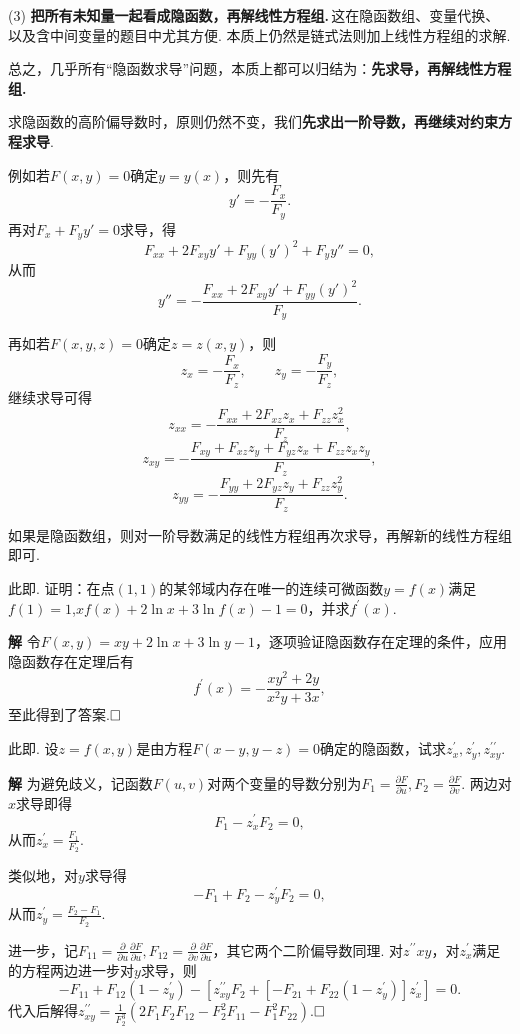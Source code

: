 \documentclass{ctexart}
\newenvironment{custom}[1]{\par\noindent \textbf{#1}\quad}{\par\vspace{1em}}
\begin{document}
(3) {\bf 把所有未知量一起看成隐函数，再解线性方程组.}\,这在隐函数组、变量代换、以及含中间变量的题目中尤其方便. 本质上仍然是链式法则加上线性方程组的求解.

总之，几乎所有“隐函数求导”问题，本质上都可以归结为：{\bf 先求导，再解线性方程组.}

求隐函数的高阶偏导数时，原则仍然不变，我们{\bf 先求出一阶导数，再继续对约束方程求导}.

例如若$F(x,y)=0$确定$y=y(x)$，则先有
\[
y'=-\frac{F_x}{F_y}.
\]
再对$F_x+F_y y'=0$求导，得
\[
F_{xx}+2F_{xy}y'+F_{yy}(y')^2+F_y y''=0,
\]
从而
\[
y''=-\frac{F_{xx}+2F_{xy}y'+F_{yy}(y')^2}{F_y}.
\]

再如若$F(x,y,z)=0$确定$z=z(x,y)$，则
\[
z_x=-\frac{F_x}{F_z},\qquad z_y=-\frac{F_y}{F_z},
\]
继续求导可得
\[
z_{xx}=-\frac{F_{xx}+2F_{xz}z_x+F_{zz}z_x^2}{F_z},
\]
\[
z_{xy}=-\frac{F_{xy}+F_{xz}z_y+F_{yz}z_x+F_{zz}z_xz_y}{F_z},
\]
\[
z_{yy}=-\frac{F_{yy}+2F_{yz}z_y+F_{zz}z_y^2}{F_z}.
\]

如果是隐函数组，则对一阶导数满足的线性方程组再次求导，再解新的线性方程组即可.

\begin{example}
此即\cite[例题20.1.1]{XHM}. 证明：在点$(1,1)$的某邻域内存在唯一的连续可微函数$y=f(x)$满足$f(1)=1$,$xf(x)+2\ln{x}+3\ln{f(x)}-1=0$，并求$f^{\prime}(x)$.
\end{example}

\begin{custom}{解}
令$F(x,y)=xy+2\ln{x}+3\ln{y}-1$，逐项验证隐函数存在定理的条件，应用隐函数存在定理后有
$$f^{\prime}(x)=-\frac{xy^{2}+2y}{x^{2}y+3x},$$
至此得到了答案.$\hfill{\square}$
\end{custom}

\begin{example}
此即\cite[例题20.1.3]{XHM}. 设$z=f(x,y)$是由方程$F(x-y,y-z)=0$确定的隐函数，试求$z_{x}^{\prime},z_{y}^{\prime},z_{xy}^{\prime\prime}$.
\end{example}

\begin{custom}{解}
为避免歧义，记函数$F(u,v)$对两个变量的导数分别为$F_{1}=\frac{\partial F}{\partial u},F_{2}=\frac{\partial F}{\partial v}$. 两边对$x$求导即得
$$F_{1}-z^{\prime}_{x}F_{2}=0,$$
从而$z^{\prime}_{x}=\frac{F_{1}}{F_{2}}$.

类似地，对$y$求导得
$$-F_{1}+F_{2}-z^{\prime}_{y}F_{2}=0,$$
从而$z^{\prime}_{y}=\frac{F_{2}-F_{1}}{F_{2}}$.

进一步，记$F_{11}=\frac{\partial}{\partial u}\frac{\partial F}{\partial u},F_{12}=\frac{\partial}{\partial v}\frac{\partial F}{\partial u}$，其它两个二阶偏导数同理. 对$z^{\prime\prime}{xy}$，对$z^{\prime}_{x}$满足的方程两边进一步对$y$求导，则
$$-F_{11}+F_{12}(1-z^{\prime}_{y})-[z^{\prime\prime}_{xy}F_{2}+[-F_{21}+F_{22}(1-z^{\prime}_{y})]z^{\prime}_{x}]=0.$$
代入后解得$z^{\prime\prime}_{xy}=\frac{1}{F_{2}^{3}}(2F_{1}F_{2}F_{12}-F_{2}^{2}F_{11}-F_{1}^{2}F_{22})$.$\hfill{\square}$
\end{custom}
\end{document}
